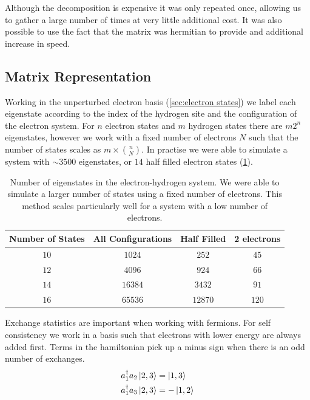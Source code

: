 Although the decomposition is
expensive it was only repeated once,
allowing us to gather a large
number of times at very little additional
cost. It was also possible to use the
fact that the matrix was hermitian to
provide and additional increase in speed.

\subsection{Matrix Representation}\label{sec:state representation}
Working in the unperturbed electron basis
(\cref{sec:electron states})
we label each eigenstate
according to the index of the
hydrogen site and
the configuration of the
electron system.
For \(n\)
electron states
and \(m\) hydrogen states
there are \(m 2^n\) eigenstates,
however we work with a fixed
number of electrons \(N\)
such that the number
of states scales as \(m \times{} \binom{n}{N}\).
In practise we were able to
simulate a system with
\(\sim 3500\) eigenstates,
or \(14\) half filled electron states
(\cref{tab:number of eigenstates}).
\begin{table}[htbp]
    \begin{center}
        \begin{tabular}{ *{4}{c} }
            \toprule
            Number of States & All Configurations & Half Filled & 2 electrons \\
            \midrule
            \(10\)           & \(1024\)           & \(252\)     & \(45\)      \\
            \(12\)           & \(4096\)           & \(924\)     & \(66\)      \\
            \(14\)           & \(16384\)          & \(3432\)    & \(91\)      \\
            \(16\)           & \(65536\)          & \(12870\)   & \(120\)     \\
            \bottomrule
        \end{tabular}
    \end{center}
    \caption{
        Number of eigenstates in the electron-hydrogen
        system. We were able to simulate a larger
        number of states using a fixed
        number of electrons.
        This method scales particularly
        well for a system with a
        low number of electrons.
    }\label{tab:number of eigenstates}
\end{table}
Exchange statistics are
important when working with
fermions.
For self consistency we work in
a basis such that electrons
with lower energy are always
added first. Terms in the
hamiltonian pick
up a minus sign when there is
an odd number of exchanges.
\begin{align}
    a^\dagger_1a_2 \ket{2,3} & = \ket{1,3}  \\
    a^\dagger_1a_3 \ket{2,3} & = -\ket{1,2}
\end{align}

